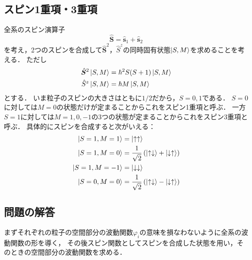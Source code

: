 \documentclass[a4paper,11pt]{jsarticle}
\begin{document}
\subsection{スピン1重項・3重項}
全系のスピン演算子
\begin{equation}
  \hat{\bm{S}} = \hat{\bm{s}}_1 + \hat{\bm{s}}_2  
\end{equation}
を考え，2つのスピンを合成して$\hat{\bm{S}}^2$，$\hat{S}^z$の同時固有状態$\ket{S,M}$を求めることを考える．
ただし
\begin{align}
  \begin{split}
    \hat{\bm{S}}^2 \ket{S,M} &= \hbar^2 S(S+1) \ket{S,M} \\
    \hat{S}^z \ket{S,M} &= \hbar M \ket{S,M}    
  \end{split}
\end{align}
とする．
いま粒子のスピンの大きさはともに$1/2$だから，$S=0,1$である．
$S=0$に対しては$M=0$の状態だけが定まることからこれをスピン1重項と呼ぶ．
一方$S=1$に対しては$M=1,0,-1$の3つの状態が定まることからこれをスピン3重項と呼ぶ．
具体的にスピンを合成すると次がいえる：
\begin{align}
  \begin{split}
    \ket{S=1, M=1} &= \ket{\uparrow\uparrow} \\
    \ket{S=1, M=0} &= \frac{1}{\sqrt{2}} \left(\ket{\uparrow\downarrow} + \ket{\downarrow\uparrow}\right) \\
    \ket{S=1, M=-1} &= \ket{\downarrow\downarrow} \\
    \ket{S=0, M=0} &= \frac{1}{\sqrt{2}} \left(\ket{\uparrow\downarrow} - \ket{\downarrow\uparrow}\right)
    \label{sm}    
  \end{split}
\end{align}

\subsection{問題の解答}
まずそれぞれの粒子の空間部分の波動関数$\varphi_i$の意味を損なわないように全系の波動関数の形を導く，
その後スピン関数としてスピンを合成した状態を用い，そのときの空間部分の波動関数を求める．
\end{document}
